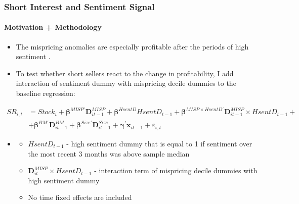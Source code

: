 \documentclass{beamer}
\begin{document}
%
\begin{frame}
	\frametitle{Short Interest and Sentiment Signal}
		\framesubtitle{Motivation + Methodology}	
	\begin{itemize}
		\item The mispricing anomalies are especially profitable after the periods of high sentiment \citet{Stambaugh2012a}. 
		\item To test whether short sellers react to the change in profitability, I add interaction of sentiment dummy with mispricing decile dummies to the baseline regression:
	\end{itemize}
{\scriptsize
		\begin{equation}		 \nonumber
		\begin{split}
			SR_{i,t} &= Stock_i+\bm{\beta}^{MISP\prime}  \bm{D}^{MISP}_{it-1}+ \bm{\beta}^{HsentD}  HsentD_{t-1} + \bm{\beta}^{MISP \times HsentD\prime}  \bm{D}^{MISP}_{it-1} \times HsentD_{t-1} + \\ 
			&+ \bm{\beta}^{BM\prime}  \bm{D}^{BM}_{it-1}+\bm{\beta}^{Size\prime}_{}  \bm{D}^{Size}_{it-1}  +\bm{\gamma}^\prime \bm{x}_{it-1} + \varepsilon_{i,t}
		\end{split}
		\end{equation}
}
\begin{itemize}
\item[]
\begin{itemize}
	\item $HsentD_{t-1}$ - high sentiment dummy that is equal to 1 if sentiment over the most recent 3 months was above sample median
	\item $\bm{D}^{MISP}_{it} \times HsentD_{t-1}$ - interaction term of mispricing decile dummies with high sentiment dummy

	\item No time fixed effects are included


\end{itemize}
\end{itemize}
\end{frame}  
\end{document}
